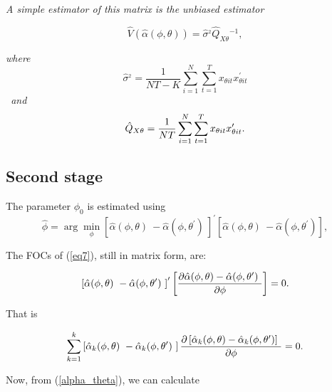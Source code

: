 \documentclass[a4paper,notitlepage,thmsb,11pt]{article}
\begin{document}
\textit{A simple estimator of this matrix is the unbiased estimator}

\begin{equation*}
\hat{V}\left( \hat{\alpha}(\phi ,\theta )\right) =\hat{\sigma}^{_{2}}\hat{Q}%
_{X\theta }{}^{-1},
\end{equation*}

\textit{where}%
\begin{equation*}
\hat{\sigma}^{_{2}}=\frac{1}{NT-K}\sum\limits_{i=1}^{N}\sum%
\limits_{t=1}^{T}x_{\theta it}x_{\theta it}^{\prime }
\end{equation*}%
\textit{\ and }%
\begin{equation*}
\hat{Q}_{X\theta }=\frac{1}{NT}\sum\limits_{i=1}^{N}\sum\limits_{t=1}^{T}x_{%
\theta it}x_{\theta it}^{\prime }.
\end{equation*}

\bigskip

\bigskip

\subsection{Second stage}

The parameter $\phi _{0}$ is estimated using%
\begin{equation}
\hat{\phi}=\arg \min_{\phi }\left[ \hat{\alpha}(\phi ,\theta )~-\hat{\alpha}%
(\phi ,\theta ^{\prime })~\right] ^{\prime }\left[ \hat{\alpha}(\phi ,\theta
)~-\hat{\alpha}(\phi ,\theta ^{\prime })\right] ,  \label{eq7}
\end{equation}

The FOCs of (\ref{eq7}), still in matrix form, are:

\begin{equation}
\left[ \hat{\alpha}(\phi ,\theta )~-\hat{\alpha}(\phi ,\theta ^{\prime })~%
\right] ^{\prime }\left[ \frac{\partial \hat{\alpha}(\phi ,\theta )-\hat{%
\alpha}(\phi ,\theta ^{\prime })~}{\partial \phi }\right] =0.
\label{FOC_2nd_stage}
\end{equation}

That is

\begin{equation*}
\sum\limits_{k=1}^{k}\left[ \hat{\alpha}_{k}(\phi ,\theta )~-\hat{\alpha}%
_{k}(\phi ,\theta ^{\prime })~\right] \frac{\partial \left[ \hat{\alpha}%
_{k}(\phi ,\theta )-\hat{\alpha}_{k}(\phi ,\theta ^{\prime })\right] ~}{%
\partial \phi }=0.
\end{equation*}

Now, from (\ref{alpha_theta}), we can calculate
\end{document}

